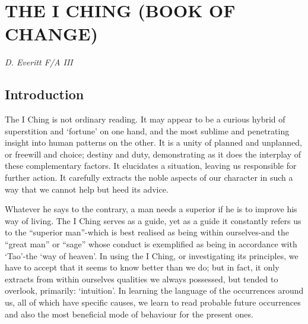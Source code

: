 \documentclass[11pt]{book}
\author{Fania Everitt}
\date{15/09/2021}
\begin{document}
\frontmatter



\mainmatter
\hypertarget{the-i-ching-book-of-change}{%
\chapter{THE I CHING (BOOK OF CHANGE)}\label{the-i-ching-book-of-change}}

\emph{D. Everitt F/A III}

\hypertarget{introduction}{%
\section{Introduction}\label{introduction}}

The I Ching is not ordinary reading. It may appear to be a curious hybrid of superstition and `fortune' on one hand, and the most sublime and penetrating insight into human patterns on the other. It is a unity of planned and unplanned, or freewill and choice; destiny and duty, demonstrating as it does the interplay of these complementary factors. It elucidates a situation, leaving us responsible for further action. It carefully extracts the noble aspects of our character in such a way that we cannot help but heed its advice.

Whatever he says to the contrary, a man needs a superior if he is to improve his way of living. The I Ching serves as a guide, yet as a guide it constantly refers us to the ``superior man''-which is best realised as being within ourselves-and the ``great man'' or ``sage'' whose conduct is exemplified as being in accordance with `Tao'-the `way of heaven'. In using the I Ching, or investigating its principles, we have to accept that it seems to know better than we do; but in fact, it only extracts from within ourselves qualities we always possessed, but tended to overlook, primarily: `intuition'. In learning the language of the occurrences around us, all of which have specific causes, we learn to read probable future occurrences and also the most beneficial mode of behaviour for the present ones.
\end{document}
